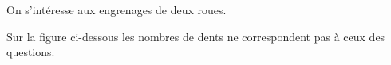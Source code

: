 \begin{exercice*}[Engrenages]
    \newcommand{\roue}[4]{%
        \foreach \i in {1,2,...,#2}
        {
        \pgfmathparse{360*(\i-1)/#2}\let\angle\pgfmathresult

        \begin{scope}[shift={(#3,#4)}]
        \pgfmathparse{#1*cos(90+360/(#2*4))}\let\Ax\pgfmathresult 
        \pgfmathparse{#1*sin(90+360/(#2*4))}\let\Ay\pgfmathresult

        \pgfmathparse{#1*cos(90-360/(#2*4))}\let\Bx\pgfmathresult
        \pgfmathparse{#1*sin(90-360/(#2*4))}\let\By\pgfmathresult

        \pgfmathparse{4*#1*cos(90+360/(#2*8))/3}\let\Cx\pgfmathresult
        \pgfmathparse{4*#1*sin(90+360/(#2*8))/3}\let\Cy\pgfmathresult

        \pgfmathparse{4*#1*cos(90-360/(#2*8))/3}\let\Dx\pgfmathresult
        \pgfmathparse{4*#1*sin(90-360/(#2*8))/3}\let\Dy\pgfmathresult

        \pgfmathparse{90-360/(#2*4)}\let\a\pgfmathresult
        \pgfmathparse{90-1.5*360/(#2*2)}\let\b\pgfmathresult

        \draw[rotate=\angle] (\Ax,\Ay) to[bend left=15] (\Cx,\Cy) -- (\Dx,\Dy) to[bend left=15] (\Bx,\By) arc (\a:\b:#1cm); 
        
        \end{scope}
        }
    }
        On s'intéresse aux engrenages de deux roues.

        Sur la figure ci-dessous les nombres de dents ne correspondent pas à ceux des questions.


\end{exercice*}
